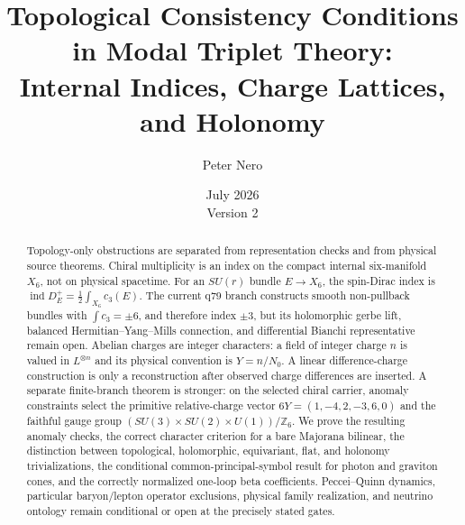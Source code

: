\documentclass[11pt]{article}
\title{Topological Consistency Conditions in Modal Triplet Theory:\\
Internal Indices, Charge Lattices, and Holonomy}
\author{Peter Nero}
\date{July 2026\\Version 2}
\theoremstyle{plain}
\theoremstyle{definition}
\theoremstyle{remark}
\newcommand{\Z}{\mathbb{Z}}
\newcommand{\ind}{\operatorname{ind}}
\begin{document}
\maketitle

\begin{abstract}
Topology-only obstructions are separated from representation checks and from
physical source theorems. Chiral multiplicity is an index on
the compact internal six-manifold $X_6$, not on physical spacetime. For an
$SU(r)$ bundle $E\to X_6$, the spin-Dirac index is
$\ind D_E^+=\frac12\int_{X_6}c_3(E)$. The current q79 branch constructs smooth
non-pullback bundles with $\int c_3=\pm6$, and therefore index $\pm3$, but its
holomorphic gerbe lift, balanced Hermitian--Yang--Mills connection, and
differential Bianchi representative remain open. Abelian charges are integer
characters: a field of integer charge $n$ is valued in $L^{\otimes n}$ and its
physical convention is $Y=n/N_0$. A linear difference-charge construction is
only a reconstruction after observed charge differences are inserted. A
separate finite-branch theorem is stronger: on the selected chiral carrier, anomaly
constraints select the primitive relative-charge vector
$6Y=(1,-4,2,-3,6,0)$ and the faithful gauge group
$(SU(3)\times SU(2)\times U(1))/\Z_6$. We prove the resulting anomaly checks,
the correct character criterion for a bare Majorana bilinear, the distinction
between topological, holomorphic, equivariant, flat, and holonomy
trivializations, the conditional common-principal-symbol result for photon and
graviton cones, and the correctly normalized one-loop beta coefficients.
Peccei--Quinn dynamics, particular baryon/lepton operator exclusions, physical
family realization, and neutrino ontology remain conditional or open at the
precisely stated gates.
\end{abstract}

\tableofcontents
\end{document}
